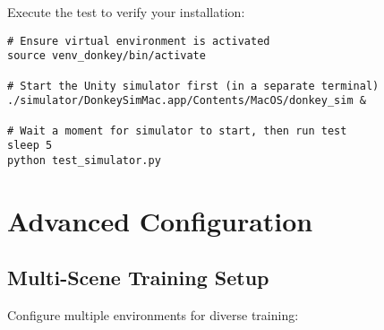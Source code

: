 \documentclass[11pt,a4paper]{article}
\begin{document}
Execute the test to verify your installation:

\begin{lstlisting}[style=bashstyle, caption={Run simulator test}]
# Ensure virtual environment is activated
source venv_donkey/bin/activate

# Start the Unity simulator first (in a separate terminal)
./simulator/DonkeySimMac.app/Contents/MacOS/donkey_sim &

# Wait a moment for simulator to start, then run test
sleep 5
python test_simulator.py
\end{lstlisting}

\section{Advanced Configuration}

\subsection{Multi-Scene Training Setup}

Configure multiple environments for diverse training:
\end{document}
